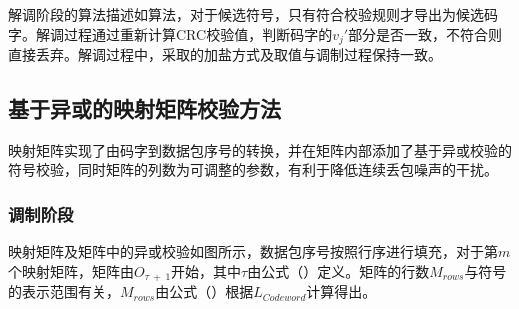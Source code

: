 解调阶段的算法描述如算法，对于候选符号，只有符合校验规则才导出为候选码字。解调过程通过重新计算CRC校验值，判断码字的$v_{j}'$部分是否一致，不符合则直接丢弃。解调过程中，采取的加盐方式及取值与调制过程保持一致。

\subsection{基于异或的映射矩阵校验方法}
\label{chap:hash:robustness:xor}

映射矩阵实现了由码字到数据包序号的转换，并在矩阵内部添加了基于异或校验的符号校验，同时矩阵的列数为可调整的参数，有利于降低连续丢包噪声的干扰。

\subsubsection{调制阶段}
\label{chap:hash:robustness:xor:modulation}


映射矩阵及矩阵中的异或校验如图所示，数据包序号按照行序进行填充，对于第$m$个映射矩阵，矩阵由$O_{\tau\ +\ 1}$开始，其中$\tau$由公式（）定义。矩阵的行数$M_{rows}$与符号的表示范围有关，$M_{rows}$由公式（）根据$L_{Codeword}$计算得出。

